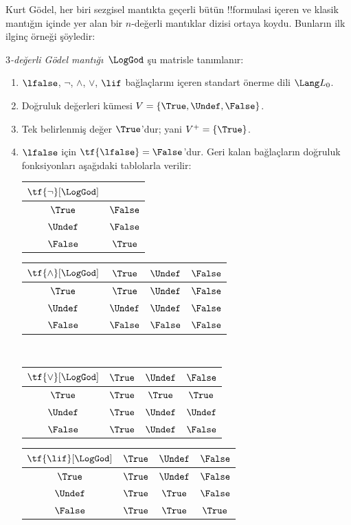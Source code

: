 \documentclass[../../../include/open-logic-section]{subfiles}
\begin{document}


Kurt G\"odel, her biri sezgisel mantıkta geçerli bütün !!{formula}s{}i
içeren ve klasik mantığın içinde yer alan bir $n$-değerli mantıklar dizisi
ortaya koydu. Bunların ilk ilginç örneği şöyledir:

\begin{defn}
\emph{$3$-değerli G\"odel mantığı}~$\LogGod$ şu matrisle tanımlanır:
\begin{enumerate}
  \item $\lfalse$, $\lnot$, $\land$, $\lor$, $\lif$ bağlaçlarını içeren
  standart önerme dili $\Lang L_0$.
  \item Doğruluk değerleri kümesi $V = \{\True, \Undef, \False\}$.
  \item Tek belirlenmiş değer $\True$'dur; yani $V^+ = \{\True\}$.
  \item $\lfalse$ için $\tf{\lfalse} = \False$'dur. Geri kalan bağlaçların
  doğruluk fonksiyonları aşağıdaki tablolarla verilir:
  \begin{center}
    \begin{tabular}{c|c} 
      $\tf{\lnot}[\LogGod]$ & \\ 
      \hline  
      $\True$ & $\False$ \\ 
      $\Undef$ & $\False$ \\
      $\False$ & $\True$ 
    \end{tabular}
    \quad
    \begin{tabular}{c|ccc} 
      $\tf{\land}[\LogGod]$ & $\True$ & $\Undef$ & $\False$ \\ 
      \hline 
      $\True$ & $\True$ & $\Undef$ & $\False$ \\ 
      $\Undef$ & $\Undef$ & $\Undef$ & $\False$\\ 
      $\False$ & $\False$ & $\False$ & $\False$ 
    \end{tabular}
    \\[2ex]
    \begin{tabular}{c|ccc} 
      $\tf{\lor}[\LogGod]$ & $\True$ & $\Undef$ & $\False$ \\ 
      \hline 
      $\True$ & $\True$ & $\True$ & $\True$ \\ 
      $\Undef$ & $\True$ & $\Undef$ & $\Undef$ \\
      $\False$ & $\True$ & $\Undef$ & $\False$ 
    \end{tabular}
    \quad
    \begin{tabular}{c|ccc} 
      $\tf{\lif}[\LogGod]$ & $\True$ & $\Undef$ & $\False$ \\ 
      \hline 
      $\True$ & $\True$ & $\Undef$ & $\False$ \\ 
      $\Undef$ & $\True$ & $\True$ & $\False$  \\ 
      $\False$ & $\True$ & $\True$ & $\True$ 
    \end{tabular}
  \end{center} 
\end{enumerate}
\end{defn}
\end{document}
